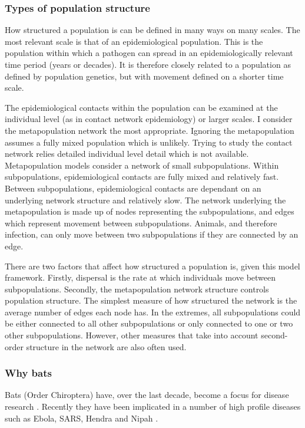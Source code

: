 \subsubsection{Types of population structure}

How structured a population is can be defined in many ways on many scales.
The most relevant scale is that of an epidemiological population.
This is the population within which a pathogen can spread in an epidemiologically relevant time period (years or decades).
It is therefore closely related to a population as defined by population genetics, but with movement defined on a shorter time scale.

The epidemiological contacts within the population can be examined at the individual level (as in contact network epidemiology) or larger scales.
I consider the metapopulation network the most appropriate.
Ignoring the metapopulation assumes a fully mixed population which is unlikely.
Trying to study the contact network relies detailed individual level detail which is not available.
Metapopulation models consider a network of small subpopulations. 
Within subpopulations, epidemiological contacts are fully mixed and relatively fast.
Between subpopulations, epidemiological contacts are dependant on an underlying network structure and relatively slow.
The network underlying the metapopulation is made up of nodes representing the subpopulations, and edges which represent movement between subpopulations.
Animals, and therefore infection, can only move between two subpopulations if they are connected by an edge.

There are two factors that affect how structured a population is, given this model framework.
Firstly, dispersal is the rate at which individuals move between subpopulations.
Secondly, the metapopulation network structure controls population structure.
The simplest measure of how structured the network is the average number of edges each node has.
In the extremes, all subpopulations could be either connected to all other subpopulations or only connected to one or two other subpopulations.
However, other measures that take into account second-order structure in the network are also often used.




\subsubsection{Why bats}
Bats (Order Chiroptera) have, over the last decade, become a focus for disease research  \cite{calisher2006bats, hughes2007emerging}.
Recently they have been implicated in a number of high profile diseases such as Ebola, SARS, Hendra and Nipah  \cite{calisher2006bats, li2005bats}.

